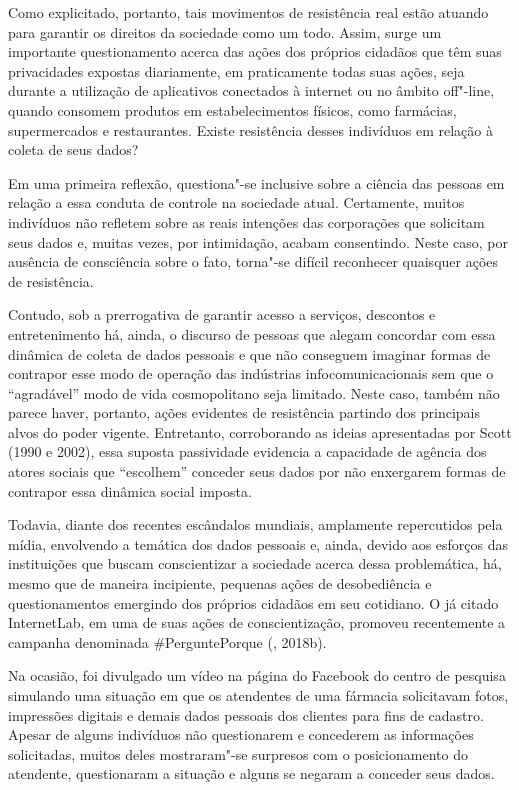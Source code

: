 Como explicitado, portanto, tais movimentos de resistência real estão
atuando para garantir os direitos da sociedade como um todo. Assim,
surge um importante questionamento acerca das ações dos próprios
cidadãos que têm suas privacidades expostas diariamente, em praticamente
todas suas ações, seja durante a utilização de aplicativos conectados à
internet ou no âmbito off"-line, quando consomem produtos em
estabelecimentos físicos, como farmácias, supermercados e restaurantes.
Existe resistência desses indivíduos em relação à coleta de seus dados?

Em uma primeira reflexão, questiona"-se inclusive sobre a ciência das
pessoas em relação a essa conduta de controle na sociedade atual.
Certamente, muitos indivíduos não refletem sobre as reais intenções das
corporações que solicitam seus dados e, muitas vezes, por intimidação,
acabam consentindo. Neste caso, por ausência de consciência sobre o
fato, torna"-se difícil reconhecer quaisquer ações de resistência.

Contudo, sob a prerrogativa de garantir acesso a serviços, descontos e
entretenimento há, ainda, o discurso de pessoas que alegam concordar com
essa dinâmica de coleta de dados pessoais e que não conseguem imaginar
formas de contrapor esse modo de operação das indústrias
infocomunicacionais sem que o ``agradável'' modo de vida cosmopolitano
seja limitado. Neste caso, também não parece haver, portanto, ações
evidentes de resistência partindo dos principais alvos do poder vigente.
Entretanto, corroborando as ideias apresentadas por Scott (1990 e 2002),
essa suposta passividade evidencia a capacidade de agência dos atores
sociais que ``escolhem'' conceder seus dados por não enxergarem formas
de contrapor essa dinâmica social imposta.

Todavia, diante dos recentes escândalos mundiais, amplamente
repercutidos pela mídia, envolvendo a temática dos dados pessoais e,
ainda, devido aos esforços das instituições que buscam conscientizar a
sociedade acerca dessa problemática, há, mesmo que de maneira
incipiente, pequenas ações de desobediência e questionamentos emergindo
dos próprios cidadãos em seu cotidiano. O já citado InternetLab, em uma
de suas ações de conscientização, promoveu recentemente a campanha
denominada \#PerguntePorque (, 2018b).

Na ocasião, foi divulgado um vídeo na página do Facebook do centro de
pesquisa simulando uma situação em que os atendentes de uma fármacia
solicitavam fotos, impressões digitais e demais dados pessoais dos
clientes para fins de cadastro. Apesar de alguns indivíduos não
questionarem e concederem as informações solicitadas, muitos deles
mostraram"-se surpresos com o posicionamento do atendente, questionaram a
situação e alguns se negaram a conceder seus dados.

